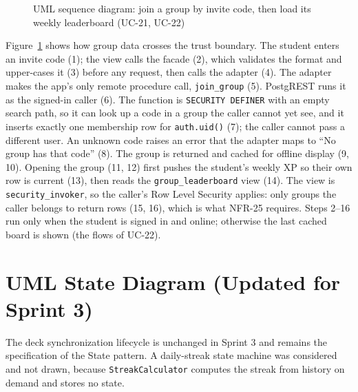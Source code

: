 \documentclass[12pt,letterpaper]{article}
\begin{document}
\begin{figure}[!htbp]
{}
\caption{UML sequence diagram: join a group by invite code, then load its weekly leaderboard (UC-21, UC-22)}
\label{fig:sequence2}
\end{figure}

Figure~\ref{fig:sequence2} shows how group data crosses the trust boundary. The
student enters an invite code (1); the view calls the facade (2), which validates the
format and upper-cases it (3) before any request, then calls the adapter (4). The
adapter makes the app's only remote procedure call, \texttt{join\_group} (5). PostgREST
runs it as the signed-in caller (6). The function is \texttt{SECURITY DEFINER} with an
empty search path, so it can look up a code in a group the caller cannot yet see,
and it inserts exactly one membership row for \texttt{auth.uid()} (7); the caller
cannot pass a different user. An unknown code raises an error that the adapter maps
to ``No group has that code'' (8). The group is returned and cached for offline display
(9, 10). Opening the group (11, 12) first pushes the student's weekly XP so their own
row is current (13), then reads the \texttt{group\_leaderboard} view (14). The view is
\texttt{security\_invoker}, so the caller's Row Level Security applies: only groups the
caller belongs to return rows (15, 16), which is what NFR-25 requires. Steps 2--16 run
only when the student is signed in and online; otherwise the last cached board is shown
(the flows of UC-22).

\section{UML State Diagram (Updated for Sprint 3)}
The deck synchronization lifecycle is unchanged in Sprint 3 and remains the
specification of the State pattern. A daily-streak state machine was considered and
not drawn, because \texttt{StreakCalculator} computes the streak from history on demand
and stores no state.
\end{document}
